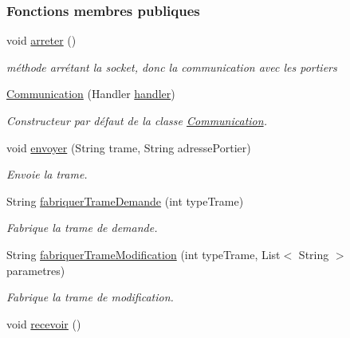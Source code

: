 \subsubsection*{Fonctions membres publiques}
\begin{DoxyCompactItemize}
\item 
void \hyperlink{classcom_1_1lasalle_1_1meeting_1_1_communication_abf23e6b879122267b3fe10233b4010a8}{arreter} ()
\begin{DoxyCompactList}\small\item\em méthode arrétant la socket, donc la communication avec les portiers \end{DoxyCompactList}\item 
\hyperlink{classcom_1_1lasalle_1_1meeting_1_1_communication_a3d73554b2774d3274ad385b0faa27d14}{Communication} (Handler \hyperlink{classcom_1_1lasalle_1_1meeting_1_1_communication_a05fa5f360f28819a9e106e0265a74643}{handler})
\begin{DoxyCompactList}\small\item\em Constructeur par défaut de la classe \hyperlink{classcom_1_1lasalle_1_1meeting_1_1_communication}{Communication}. \end{DoxyCompactList}\item 
void \hyperlink{classcom_1_1lasalle_1_1meeting_1_1_communication_a03f0e419513d7f33900dde412e2a4471}{envoyer} (String trame, String adresse\+Portier)
\begin{DoxyCompactList}\small\item\em Envoie la trame. \end{DoxyCompactList}\item 
String \hyperlink{classcom_1_1lasalle_1_1meeting_1_1_communication_a3b07023cb3f3a1549da711b5c6ba6af1}{fabriquer\+Trame\+Demande} (int type\+Trame)
\begin{DoxyCompactList}\small\item\em Fabrique la trame de demande. \end{DoxyCompactList}\item 
String \hyperlink{classcom_1_1lasalle_1_1meeting_1_1_communication_a82b49090e24d8296bfd26a14e0951ade}{fabriquer\+Trame\+Modification} (int type\+Trame, List$<$ String $>$ parametres)
\begin{DoxyCompactList}\small\item\em Fabrique la trame de modification. \end{DoxyCompactList}\item 
void \hyperlink{classcom_1_1lasalle_1_1meeting_1_1_communication_a0344b79faa04dded3468fb8dda6baa81}{recevoir} ()

\end{DoxyCompactItemize}
